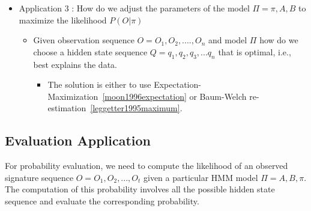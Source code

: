 \begin{itemize}
\item Application 3 : How do we adjust the parameters of the model $\Pi = {\pi, A, B}$ to maximize the likelihood $P(O|\pi)$ 
 \begin{itemize}
 \item Given observation sequence $O = {O_1, O_2,....,}O_n$ and model $\Pi$ how do we choose a hidden state sequence $Q={q_1,q_2,q_3,...q_n}$
that is optimal, i.e., best explains the data. 
  \begin{itemize}
  \item The solution is either to use Expectation-Maximization~\ref{moon1996expectation} or Baum-Welch re-estimation~\ref{leggetter1995maximum}.
  \end{itemize}
 \end{itemize}
\end{itemize}









\subsection{Evaluation Application}

For probability evaluation, we need to compute the likelihood of an observed signature sequence $O = {O_1, O_2,...,O_t}$ given a particular HMM model $ \Pi = {A, B, \pi}$. The computation of this probability involves all the possible hidden state sequence and evaluate the corresponding probability. 

